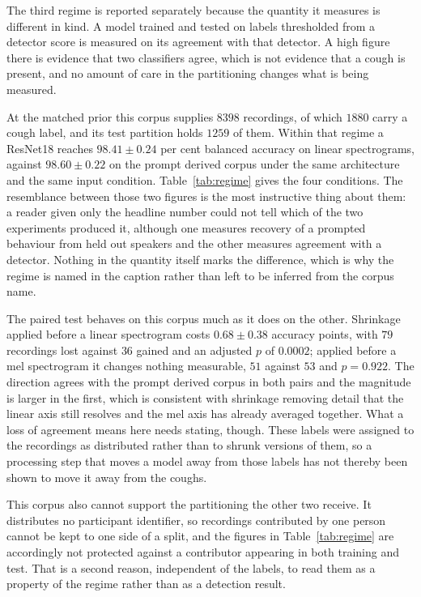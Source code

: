 The third regime is reported separately because the quantity it measures is different in
kind. A model trained and tested on labels thresholded from a detector score is measured on
its agreement with that detector. A high figure there is evidence that two classifiers
agree, which is not evidence that a cough is present, and no amount of care in the
partitioning changes what is being measured.

At the matched prior this corpus supplies $8398$ recordings, of which $1880$ carry a cough
label, and its test partition holds $1259$ of them. Within that regime a ResNet18 reaches
$98.41 \pm 0.24$ per cent balanced accuracy on linear spectrograms, against $98.60 \pm
0.22$ on the prompt derived corpus under the same architecture and the same input
condition. Table~\ref{tab:regime} gives the four conditions. The resemblance between those
two figures is the most instructive thing about them: a reader given only the headline
number could not tell which of the two experiments produced it, although one measures
recovery of a prompted behaviour from held out speakers and the other measures agreement
with a detector. Nothing in the quantity itself marks the difference, which is why the
regime is named in the caption rather than left to be inferred from the corpus name.



The paired test behaves on this corpus much as it does on the other. Shrinkage applied
before a linear spectrogram costs $0.68 \pm 0.38$ accuracy points, with $79$ recordings
lost against $36$ gained and an adjusted $p$ of $0.0002$; applied before a mel spectrogram
it changes nothing measurable, $51$ against $53$ and $p = 0.922$. The direction agrees
with the prompt derived corpus in both pairs and the magnitude is larger in the first,
which is consistent with shrinkage removing detail that the linear axis still resolves and
the mel axis has already averaged together. What a loss of agreement means here needs
stating, though. These labels were assigned to the recordings as distributed rather than to
shrunk versions of them, so a processing step that moves a model away from those labels has
not thereby been shown to move it away from the coughs.

This corpus also cannot support the partitioning the other two receive. It distributes no
participant identifier, so recordings contributed by one person cannot be kept to one side
of a split, and the figures in Table~\ref{tab:regime} are accordingly not protected against
a contributor appearing in both training and test. That is a second reason, independent of
the labels, to read them as a property of the regime rather than as a detection result.

